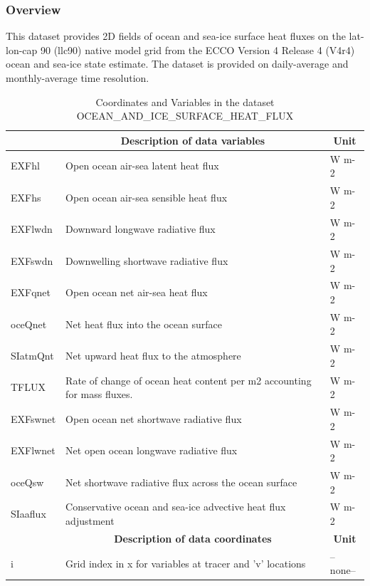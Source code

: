 \subsubsection{Overview}
This dataset provides 2D fields of ocean and sea-ice surface heat fluxes on the lat-lon-cap 90 (llc90) native model grid from the ECCO Version 4 Release 4 (V4r4) ocean and sea-ice state estimate. The dataset is provided on daily-average and monthly-average time resolution. 
\begin{longtable}{|m{}|m{}|m{}|}
\caption{Coordinates and Variables in the dataset OCEAN\_AND\_ICE\_SURFACE\_HEAT\_FLUX}
\label{tab:table-OCEAN_AND_ICE_SURFACE_HEAT_FLUX-fields} \\ 
\hline \endhead \hline \endfoot
\rowcolor{lightgray} \multicolumn{1}{|c|}{\textbf{Variables}} & \multicolumn{1}{|c|}{\textbf{Description of data variables}} &  \multicolumn{1}{|c|}{\textbf{Unit}}\\ \hline
EXFhl &Open ocean air-sea latent heat flux &W m-2  \\ \hline
EXFhs &Open ocean air-sea sensible heat flux &W m-2  \\ \hline
EXFlwdn &Downward longwave radiative flux &W m-2  \\ \hline
EXFswdn &Downwelling shortwave radiative flux &W m-2  \\ \hline
EXFqnet &Open ocean net air-sea heat flux &W m-2  \\ \hline
oceQnet &Net heat flux into the ocean surface &W m-2  \\ \hline
SIatmQnt &Net upward heat flux to the atmosphere &W m-2  \\ \hline
TFLUX &Rate of change of ocean heat content per m2 accounting for mass fluxes. &W m-2  \\ \hline
EXFswnet &Open ocean net shortwave radiative flux &W m-2  \\ \hline
EXFlwnet &Net open ocean longwave radiative flux &W m-2  \\ \hline
oceQsw &Net shortwave radiative flux across the ocean surface &W m-2  \\ \hline
SIaaflux &Conservative ocean and sea-ice advective heat flux adjustment &W m-2  \\ \hline
\rowcolor{lightgray} \multicolumn{1}{|c|}{\textbf{Coordinates}} & \multicolumn{1}{|c|}{\textbf{Description of data coordinates}} &  \multicolumn{1}{|c|}{\textbf{Unit}}\\ \hline
i &Grid index in x for variables at tracer and 'v' locations &--none--  \\ \hline

\end{longtable}
